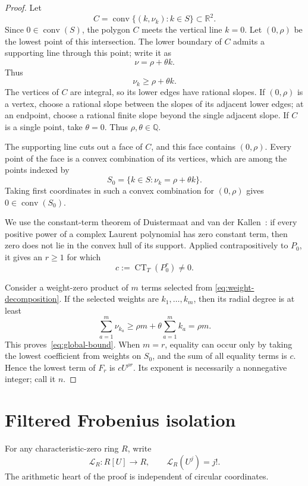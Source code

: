 \documentclass[11pt]{article}
\newcommand{\CT}{\operatorname{CT}}
\newcommand{\conv}{\operatorname{conv}}
\begin{document}
\begin{proof}
Let
\[
  C=\conv\{(k,\nu_k):k\in S\}\subset\mathbb R^2.
\]
Since \(0\in\conv(S)\), the polygon \(C\) meets the vertical line \(k=0\).
Let \((0,\rho)\) be the lowest point of this intersection.  The lower
boundary of \(C\) admits a supporting line through this point; write it as
\[
  \nu=\rho+\theta k.
\]
Thus
\[
  \nu_k\geq\rho+\theta k.
\]
The vertices of \(C\) are integral, so its lower edges have rational
slopes.  If \((0,\rho)\) is a vertex, choose a rational slope between the
slopes of its adjacent lower edges; at an endpoint, choose a rational
finite slope beyond the single adjacent slope.  If \(C\) is a single point,
take \(\theta=0\).  Thus \(\rho,\theta\in\mathbb Q\).

The supporting line cuts out a face of \(C\), and this face contains
\((0,\rho)\).  Every point of the face is a convex combination of its
vertices, which are among the points indexed by
\[
  S_0=\{k\in S:\nu_k=\rho+\theta k\}.
\]
Taking first coordinates in such a convex combination for \((0,\rho)\)
gives \(0\in\conv(S_0)\).

We use the constant-term theorem of Duistermaat and van der
Kallen~\cite{DK}: if every positive power of a complex Laurent polynomial
has zero constant term, then zero does not lie in the convex hull of its
support.  Applied contrapositively to \(P_0\), it gives an \(r\geq1\) for
which
\[
  c:=\CT_T(P_0^r)\neq0.
\]

Consider a weight-zero product of \(m\) terms selected from
\eqref{eq:weight-decomposition}.  If the selected weights are
\(k_1,\ldots,k_m\), then its radial degree is at least
\[
  \sum_{a=1}^m\nu_{k_a}
  \geq \rho m+\theta\sum_{a=1}^m k_a
  =\rho m.
\]
This proves~\eqref{eq:global-bound}.  When \(m=r\), equality can occur only
by taking the lowest coefficient from weights on \(S_0\), and the sum of
all equality terms is \(c\).  Hence the lowest term of \(F_r\) is
\(cU^{\rho r}\).  Its exponent is necessarily a nonnegative integer; call
it \(n\).
\end{proof}

\section{Filtered Frobenius isolation}

For any characteristic-zero ring \(R\), write
\[
  \mathcal L_R:R[U]\longrightarrow R,\qquad
  \mathcal L_R(U^j)=j!.
\]
The arithmetic heart of the proof is independent of circular coordinates.
\end{document}
